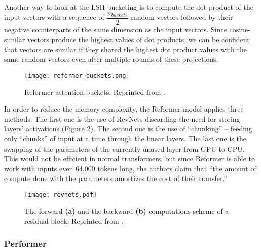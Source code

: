Another way to look at the LSH bucketing is to compute the dot product of the input vectors with a sequence of $\dfrac{n_{buckets}}{2}$ random vectors followed by their negative counterparts of the same dimension as the input vectors.
Since cosine-similar vectors produce the highest values of dot products, we can be confident that vectors are similar if they shared the highest dot product values with the same random vectors even after multiple rounds of these projections.

\begin{figure}[!htb]
        \centering
        \texttt{[image: reformer\_buckets.png]}
        \caption[Reformer Attention Visualization]{Reformer attention buckets. Reprinted from \citep{reformer}.}
        \label{fig:reformer_buckets}
\end{figure}

In order to reduce the memory complexity, the Reformer model applies three methods.
The first one is the use of RevNets \citep{revnets} discarding the need for storing layers' activations (Figure \ref{fig:revnets}). The second one is the use of ``chunking'' -- feeding only ``chunks'' of input at a time through the linear layers.
The last one is the swapping of the parameters of the currently unused layer from GPU to CPU. This would not be efficient in normal transformers, but since Reformer is able to work with inputs even 64,000 tokens long, the authors claim that ``the amount of compute done with the parameters amortizes the cost of their transfer.''

\begin{figure}[!htb]
        \centering
        \texttt{[image: revnets.pdf]}
        \caption[RevNet Scheme]{The forward \textbf{(a)} and the backward \textbf{(b)} computations scheme of a residual block. Reprinted from \citep{revnets}.}
        \label{fig:revnets}
\end{figure}

\subsubsection{Performer}

